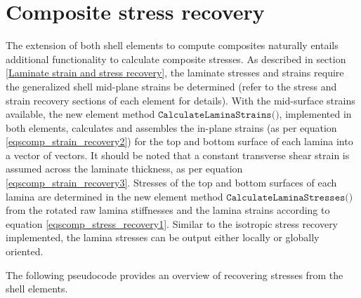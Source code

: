 \section{Composite stress recovery}
\label{composite stress recovery}
The extension of both shell elements to compute composites naturally entails additional functionality to calculate composite stresses. As described in section \ref{Laminate strain and stress recovery}, the laminate stresses and strains require the generalized shell mid-plane strains be determined (refer to the stress and strain recovery sections of each element for details). With the mid-surface strains available, the new element method $\texttt{CalculateLaminaStrains()}$, implemented in both elements, calculates and assembles the in-plane strains (as per equation \ref{eqscomp_strain_recovery2}) for the top and bottom surface of each lamina into a vector of vectors. It should be noted that a constant transverse shear strain is assumed across the laminate thickness, as per equation \ref{eqscomp_strain_recovery3}. Stresses of the top and bottom surfaces of each lamina are determined in the new element method $\texttt{CalculateLaminaStresses()}$ from the rotated raw lamina stiffnesses and the lamina strains according to equation \ref{eqscomp_stress_recovery1}. Similar to the isotropic stress recovery implemented, the lamina stresses can be output either locally or globally oriented.

The following pseudocode provides an overview of recovering stresses from the shell elements.

